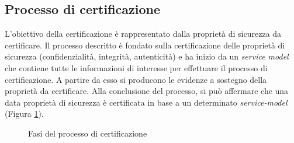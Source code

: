 \documentclass[../main.tex]{subfiles}
\begin{document}
\subsection{Processo di certificazione}


L'obiettivo della certificazione è rappresentato dalla proprietà di sicurezza da certificare.
Il processo descritto è fondato sulla certificazione delle proprietà di sicurezza (confidenzialità, integrità, autenticità) e ha inizio da un \textit{service model} che contiene tutte le informazioni di interesse per effettuare il processo di certificazione.
A partire da esso si producono le evidenze a sostegno della proprietà da certificare.
Alla conclusione del processo, si può affermare che una data proprietà di sicurezza è certificata in base a un determinato \textit{service-model} (Figura \ref{fig:CertSoaFig1a}).

\begin{figure}[H]
\centering
{}
\caption{Fasi del processo di certificazione \cite{CitCertSoa}}\label{fig:CertSoaFig1a}
\end{figure}
\end{document}
